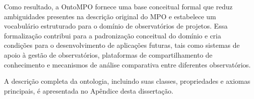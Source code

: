 Como resultado, a OntoMPO fornece uma base conceitual formal que reduz ambiguidades presentes na descrição original do MPO e estabelece um vocabulário estruturado para o domínio de observatórios de projetos. Essa formalização contribui para a padronização conceitual do domínio e cria condições para o desenvolvimento de aplicações futuras, tais como sistemas de apoio à gestão de observatórios, plataformas de compartilhamento de conhecimento e mecanismos de análise comparativa entre diferentes observatórios.

A descrição completa da ontologia, incluindo suas classes, propriedades e axiomas principais, é apresentada no Apêndice desta dissertação.
